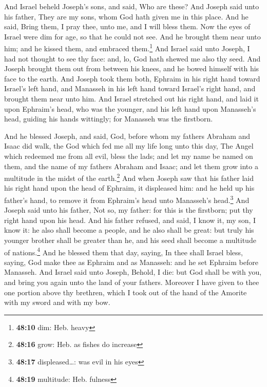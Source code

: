  And Israel beheld Joseph's sons, and said, Who are these?
 And Joseph said unto his father, They are my sons, whom
God hath given me in this place. And he said, Bring them, I pray thee,
unto me, and I will bless them.  Now the eyes of Israel
were dim for age, so that he could not see. And he brought them near
unto him; and he kissed them, and embraced them.\footnote{\textbf{48:10}
  dim: Heb. heavy}  And Israel said unto Joseph, I had
not thought to see thy face: and, lo, God hath shewed me also thy seed.
 And Joseph brought them out from between his knees, and
he bowed himself with his face to the earth.  And Joseph
took them both, Ephraim in his right hand toward Israel's left hand, and
Manasseh in his left hand toward Israel's right hand, and brought them
near unto him.  And Israel stretched out his right hand,
and laid it upon Ephraim's head, who was the younger, and his left hand
upon Manasseh's head, guiding his hands wittingly; for Manasseh was the
firstborn.

 And he blessed Joseph, and said, God, before whom my
fathers Abraham and Isaac did walk, the God which fed me all my life
long unto this day,  The Angel which redeemed me from all
evil, bless the lads; and let my name be named on them, and the name of
my fathers Abraham and Isaac; and let them grow into a multitude in the
midst of the earth.\footnote{\textbf{48:16} grow: Heb. as fishes do
  increase}  And when Joseph saw that his father laid his
right hand upon the head of Ephraim, it displeased him: and he held up
his father's hand, to remove it from Ephraim's head unto Manasseh's
head.\footnote{\textbf{48:17} displeased\ldots: was evil in his eyes}
 And Joseph said unto his father, Not so, my father: for
this is the firstborn; put thy right hand upon his head. 
And his father refused, and said, I know it, my son, I know it: he also
shall become a people, and he also shall be great: but truly his younger
brother shall be greater than he, and his seed shall become a multitude
of nations.\footnote{\textbf{48:19} multitude: Heb. fulness}
 And he blessed them that day, saying, In thee shall
Israel bless, saying, God make thee as Ephraim and as Manasseh: and he
set Ephraim before Manasseh.  And Israel said unto
Joseph, Behold, I die: but God shall be with you, and bring you again
unto the land of your fathers.  Moreover I have given to
thee one portion above thy brethren, which I took out of the hand of the
Amorite with my sword and with my bow.

